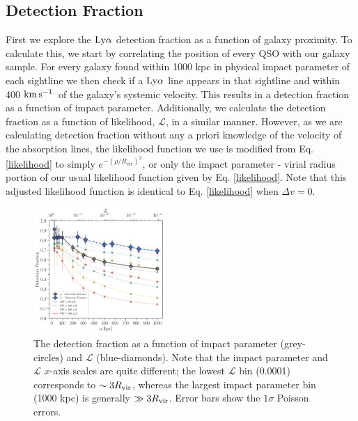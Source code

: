 \documentclass[twocolumn,tighten]{aastex62}
\newcommand{\kms}{$\rm km\, s^{-1}$}
\begin{document}
\subsection{Detection Fraction}
First we explore the $\rm Ly\alpha$ detection fraction as a function of galaxy proximity. To calculate this, we start by correlating the position of every QSO with our galaxy sample. For every galaxy found within 1000 kpc in physical impact parameter of each sightline we then check if a $\rm Ly\alpha$ line appears in that sightline and within 400 \kms~of the galaxy's systemic velocity. This results in a detection fraction as a function of impact parameter. Additionally, we calculate the detection fraction as a function of likelihood, $\mathcal{L}$, in a similar manner. However, as we are calculating detection fraction without any a priori knowledge of the velocity of the absorption lines, the likelihood function we use is modified from Eq. \ref{likelihood} to simply $e^{-(\rho/R_{vir})^2}$, or only the impact parameter - virial radius portion of our usual likelihood function given by Eq. \ref{likelihood}. Note that this adjusted likelihood function is identical to Eq. \ref{likelihood} when $\Delta v = 0$. 

\begin{figure}[t!]
        \centering
        \vspace{0pt}
        \includegraphics[width=0.45\textwidth]{detection_fraction_min0_50_100_200_300_both_alt3.pdf}
        \caption{\small{The detection fraction as a function of impact parameter (grey-circles) and $\mathcal{L}$ (blue-diamonds). Note that the impact parameter and $\mathcal{L}$ $x$-axis scales are quite different; the lowest $\mathcal{L}$ bin (0.0001) corresponds to $\sim 3 R_{\rm vir}$, whereas the largest impact parameter bin (1000 kpc) is generally $\gg 3 R_{\rm vir}$. Error bars show the $1\sigma$ Poisson errors.}}
        \vspace{0pt}
        \label{detection_fraction}
\end{figure}
\end{document}
